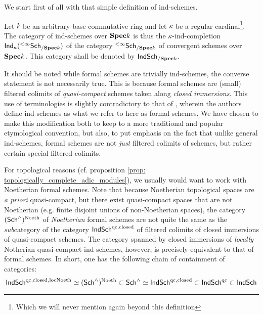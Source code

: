                 We start first of all with that simple definition of ind-schemes.
                \begin{definition} \label{def: ind-schemes}
                    Let $k$ be an arbitrary base commutative ring and let $\kappa$ be a regular cardinal\footnote{Which we will never mention again beyond this definition}. The category of ind-schemes over $\mathbf{Spec} k$ is thus the $\kappa$-ind-completion $\mathsf{Ind}_{\kappa}({}^{< \infty}\mathsf{Sch}_{/\mathbf{Spec} k})$ of the category ${}^{< \infty}\mathsf{Sch}_{/\mathbf{Spec} k}$ of convergent schemes over $\mathbf{Spec} k$. This category shall be denoted by $\mathsf{Ind}\mathsf{Sch}_{/\mathbf{Spec} k}$.
                \end{definition}
                \begin{remark} \label{remark: ind_schemes_vs_formal_schemes}
                    It should be noted while formal schemes are trivially ind-schemes, the converse statement is not necessarily true. This is because formal schemes are (small) filtered colimits of \textit{quasi-compact} schemes taken along \textit{closed immersions}. This use of terminologies is slightly contradictory to that of \cite[Definition I.2.1.1.2]{GR2}, wherein the authors define ind-schemes as what we refer to here as formal schemes. We have chosen to make this modification both to keep to a more traditional and popular etymological convention, but also, to put emphasis on the fact that unlike general ind-schemes, formal schemes are not \textit{just} filtered colimits of schemes, but rather certain special filtered colimits.
                    
                    For topological reasons (cf. proposition \ref{prop: topologically_complete_adic_modules}), we usually would want to work with Noetherian formal schemes. Note that because Noetherian topological spaces are \textit{a priori} quasi-compact, but there exist quasi-compact spaces that are not Noetherian (e.g. finite disjoint unions of non-Noetherian spaces), the category $(\mathsf{Sch}^{\wedge})^{\mathrm{Noeth}}$ of \textit{Noetherian} formal schemes are not quite the same as the \textit{sub}category of the category $\mathsf{Ind}\mathsf{Sch}^{\mathrm{qc}, \mathrm{closed}}$ of filtered colimits of closed immersions of quasi-compact schemes. The category spanned by closed immersions of \textit{locally} Notherian quasi-compact ind-schemes, however, is precisely equivalent to that of formal schemes. In short, one has the following chain of containment of categories:
                        $$\mathsf{Ind}\mathsf{Sch}^{\mathrm{qc}, \mathrm{closed}, \mathrm{loc}\mathrm{Noeth}} \simeq (\mathsf{Sch}^{\wedge})^{\mathrm{Noeth}} \subset \mathsf{Sch}^{\wedge} \simeq \mathsf{Ind}\mathsf{Sch}^{\mathrm{qc}, \mathrm{closed}} \subset \mathsf{Ind}\mathsf{Sch}^{\mathrm{qc}} \subset \mathsf{Ind}\mathsf{Sch}$$
                \end{remark}
